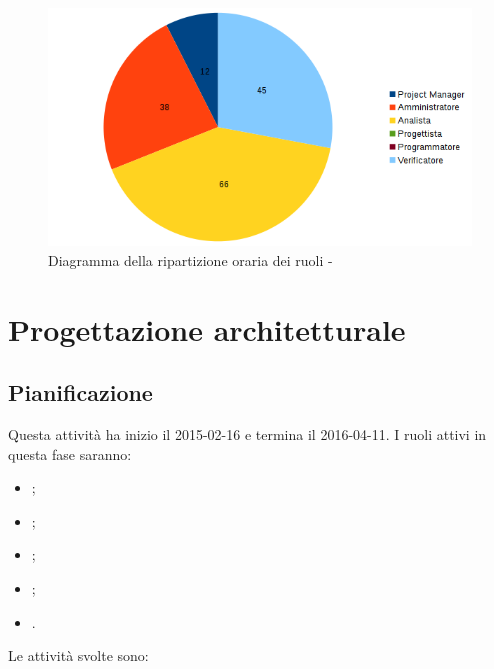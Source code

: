 \documentclass[12pt,a4paper]{article}
\begin{document}
\begin{center}
	\begin{figure}[H]
		\centering
		\includegraphics[width=\textwidth]{diagrammaTortaAnalisiTotaleOre.png}
		\caption{Diagramma della ripartizione oraria dei ruoli - \FA}
	\end{figure}
\end{center}

\newpage

\section{Progettazione architetturale} %

\subsection{Pianificazione}

Questa attività ha inizio il 2015-02-16 e termina il 2016-04-11.
I ruoli attivi in questa fase saranno:

\begin{itemize}
	\item \PM;
	\item \AM;
	\item \AN;
	\item \PR;
	\item \VR.
\end{itemize}

Le attività svolte sono:
\end{document}
